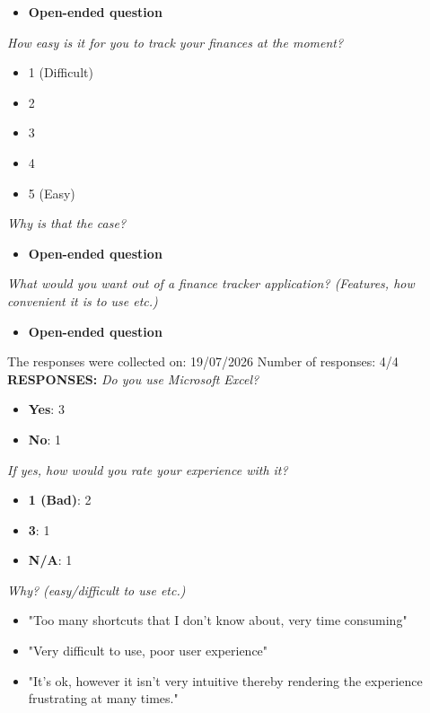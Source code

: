 \documentclass{article}
\begin{document}
\begin{itemize}
    \item \textbf{Open-ended question}
\end{itemize}
\textit{How easy is it for you to track your finances at the moment?}
\begin{itemize}
    \item 1 (Difficult)
    \item 2
    \item 3
    \item 4
    \item 5 (Easy)
\end{itemize}
\textit{Why is that the case?}
\begin{itemize}
    \item \textbf{Open-ended question}
\end{itemize}
\textit{What would you want out of a finance tracker application? (Features, how convenient it is to use etc.)}
\begin{itemize}
    \item \textbf{Open-ended question}
\end{itemize}
The responses were collected on: 19/07/2026 \newline
Number of responses: 4/4 \newline \newline
\textbf{RESPONSES:} \newline
\textit{Do you use Microsoft Excel?}
\begin{itemize}
    \item \textbf{Yes}: 3
    \item \textbf{No}: 1
\end{itemize}
\textit{If yes, how would you rate your experience with it?}
\begin{itemize}
    \item \textbf{1 (Bad)}: 2
    \item \textbf{3}: 1
    \item \textbf{N/A}: 1
\end{itemize}
\textit{Why? (easy/difficult to use etc.)}
\begin{itemize}
    \item "Too many shortcuts that I don’t know about, very time consuming"
    \item "Very difficult to use, poor user experience"
    \item "It’s ok, however it isn’t very intuitive thereby rendering the experience frustrating at many times."
\end{itemize}
\end{document}
